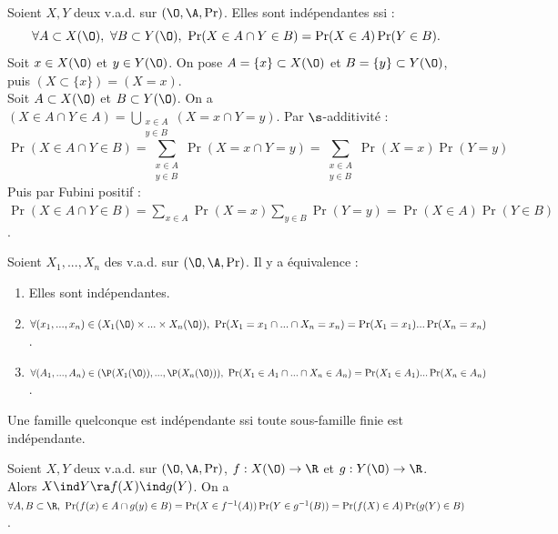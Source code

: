 \documentclass[11pt]{article}
\begin{document}
\begin{thm}{}{}
    Soient $X,Y$ deux v.a.d. sur $(\O,\A,\Pr)$. Elles sont indépendantes ssi :
    \begin{equation*}
        \forall A \subset X(\O), ~ \forall B \subset Y(\O), ~ \Pr(X\in A \cap Y \in B) = \Pr(X\in A)\Pr(Y \in B).
    \end{equation*}
    \tcblower
    \boxed{\la} Soit $x\in X(\O)$ et $y\in Y(\O)$. On pose $A=\{x\}\subset X(\O)$ et $B=\{y\}\subset Y(\O)$, puis $(X \subset \{x\}) = (X=x)$.\\
    \boxed{\ra} Soit $A\subset X(\O)$ et $B\subset Y(\O)$. On a $(X\in A \cap Y \in A) = \bigcup_{\substack{x\in A\\y\in B}}(X=x\cap Y=y)$. Par $\s$-additivité :
    \begin{equation*}
        \Pr(X\in A \cap Y \in B) = \sum_{\substack{x\in A\\y\in B}}\Pr(X=x\cap Y=y)=\sum_{\substack{x\in A\\ y \in B}}\Pr(X=x)\Pr(Y=y)
    \end{equation*}
    Puis par Fubini positif : $\Pr(X\in A \cap Y \in B) = \sum_{x\in A}\Pr(X=x)\sum_{y\in B}\Pr(Y=y) = \Pr(X\in A)\Pr(Y\in B)$.
\end{thm}

\begin{defi}{}{}
    Soient $X_1,...,X_n$ des v.a.d. sur $(\O,\A,\Pr)$. Il y a équivalence :
    \begin{enumerate}
        \item Elles sont indépendantes.
        \item $\forall (x_1,...,x_n) \in (X_1(\O)\times...\times X_n(\O)), ~ \Pr(X_1=x_1 \cap ... \cap X_n=x_n)=\Pr(X_1=x_1)...\Pr(X_n=x_n)$.
        \item $\forall (A_1,...,A_n) \in (\P(X_1(\O)),...,\P(X_n(\O))), ~ \Pr(X_1\in A_1\cap...\cap X_n\in A_n)=\Pr(X_1\in A_1)...\Pr(X_n\in A_n)$.
    \end{enumerate}
    Une famille quelconque est indépendante ssi toute sous-famille finie est indépendante. 
\end{defi}

\begin{prop}{}{}
    Soient $X,Y$ deux v.a.d. sur $(\O,\A,\Pr)$, $f:X(\O)\to\R$ et $g:Y(\O)\to\R$.\\
    Alors $X\ind Y \ra f(X) \ind g(Y)$.
    \tcblower
    On a $\forall A,B \subset \R, ~ \Pr(f(x)\in A \cap g(y)\in B)=\Pr(X\in f^{-1}(A))\Pr(Y\in g^{-1}(B))=\Pr(f(X)\in A)\Pr(g(Y)\in B)$.
\end{prop}
\end{document}
